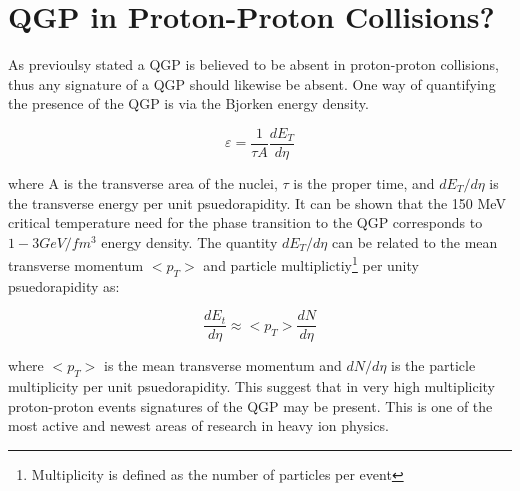 
\section{QGP in Proton-Proton Collisions?}
As previoulsy stated a QGP is believed to be absent in proton-proton collisions, thus any signature of a QGP should likewise be absent.  One way of quantifying the presence of the QGP is via the Bjorken energy density.  

\begin{equation}
\varepsilon = \frac{1}{\tau A} \frac{dE_{T}}{d \eta}
\label{eq:bjorkenEt}
\end{equation}

\noindent
where A is the transverse area of the nuclei, $\tau$ is the proper time, and $dE_{T}/d \eta$ is the transverse energy per unit psuedorapidity.  It can be shown that  the 150 MeV critical temperature need for the phase transition to the QGP corresponds to ~ $1 - 3 GeV/fm^{3}$ energy density.  The quantity $dE_{T}/d \eta$ can be related to the mean transverse momentum $<p_{T}>$ and particle multiplictiy\footnote{Multiplicity is defined as the number of particles per event} per unity psuedorapidity as:

\begin{equation}
\frac{dE_{t}}{d \eta}  \approx  <p_{T}> \frac{dN}{d\eta}
\label{eq:Et}
\end{equation}

where $ <p_{T} >$ is the mean transverse momentum and $dN/d\eta$ is the particle multiplicity per unit psuedorapidity.
This suggest that in very high multiplicity proton-proton events signatures of the QGP may be present.  This is one of the most active and newest areas of research in heavy ion physics.  